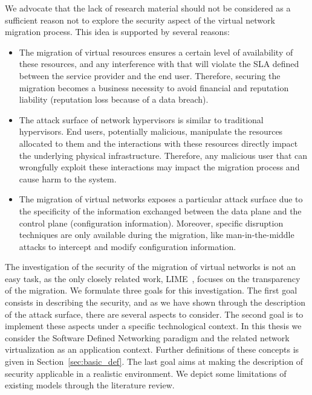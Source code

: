 We advocate that the lack of research material should not be considered as a sufficient reason not to explore the security aspect of the virtual network migration process. This idea is supported by several reasons:

\begin{itemize}
    
    \item The migration of virtual resources ensures a certain level of availability of these resources, and any interference with that will violate the SLA defined between the service provider and the end user.
    Therefore, securing the migration becomes a business necessity to avoid financial and reputation liability (\eg reputation loss because of a data breach).
    
    \item The attack surface of network hypervisors is similar to traditional hypervisors. End users, potentially malicious, manipulate the resources allocated to them and the interactions with these resources directly impact the underlying physical infrastructure. Therefore, any malicious user that can wrongfully exploit these interactions may impact the migration process and cause harm to the system.

    \item The migration of virtual networks exposes a particular attack surface due to the specificity of the information exchanged between the data plane and the control plane (\eg configuration information). Moreover, specific disruption techniques are only available during the migration, like man-in-the-middle attacks to intercept and modify configuration information.  
\end{itemize}

The investigation of the security of the migration of virtual networks is not an easy task, as the only closely related work, LIME~\cite{Lime-Ghorbani2014}, focuses on the transparency of the migration. 
We formulate three goals for this investigation.
The first goal consists in describing the security, and as we have shown through the description of the attack surface, there are several aspects to consider. 
The second goal is to implement these aspects under a specific technological context. In this thesis we consider the Software Defined Networking paradigm and the related network virtualization as an application context. Further definitions of these concepts is given in Section~\ref{sec:basic_def}. 
The last goal aims at making the description of security applicable in a realistic environment.
We depict some limitations of existing models through the literature review.



